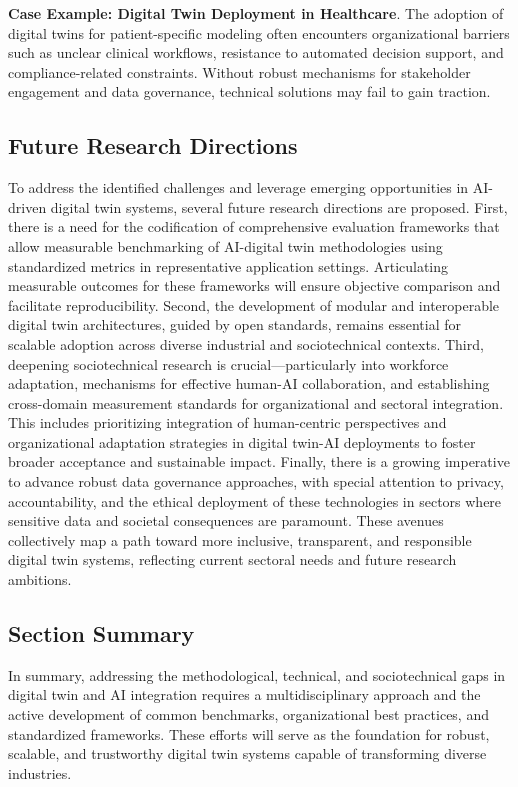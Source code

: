 \documentclass[sigconf]{acmart}
\begin{document}
\textbf{Case Example: Digital Twin Deployment in Healthcare}. The adoption of digital twins for patient-specific modeling often encounters organizational barriers such as unclear clinical workflows, resistance to automated decision support, and compliance-related constraints. Without robust mechanisms for stakeholder engagement and data governance, technical solutions may fail to gain traction.

\subsection{Future Research Directions}

To address the identified challenges and leverage emerging opportunities in AI-driven digital twin systems, several future research directions are proposed. First, there is a need for the codification of comprehensive evaluation frameworks that allow measurable benchmarking of AI-digital twin methodologies using standardized metrics in representative application settings. Articulating measurable outcomes for these frameworks will ensure objective comparison and facilitate reproducibility. Second, the development of modular and interoperable digital twin architectures, guided by open standards, remains essential for scalable adoption across diverse industrial and sociotechnical contexts. Third, deepening sociotechnical research is crucial—particularly into workforce adaptation, mechanisms for effective human-AI collaboration, and establishing cross-domain measurement standards for organizational and sectoral integration. This includes prioritizing integration of human-centric perspectives and organizational adaptation strategies in digital twin-AI deployments to foster broader acceptance and sustainable impact. Finally, there is a growing imperative to advance robust data governance approaches, with special attention to privacy, accountability, and the ethical deployment of these technologies in sectors where sensitive data and societal consequences are paramount. These avenues collectively map a path toward more inclusive, transparent, and responsible digital twin systems, reflecting current sectoral needs and future research ambitions.

\subsection{Section Summary}

In summary, addressing the methodological, technical, and sociotechnical gaps in digital twin and AI integration requires a multidisciplinary approach and the active development of common benchmarks, organizational best practices, and standardized frameworks. These efforts will serve as the foundation for robust, scalable, and trustworthy digital twin systems capable of transforming diverse industries.
\end{document}
